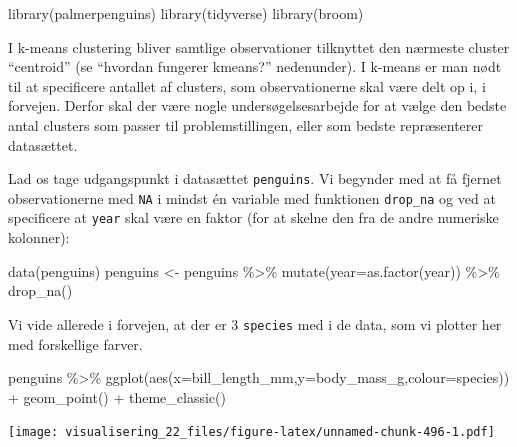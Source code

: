 \documentclass[
]{book}
\newenvironment{Shaded}{\begin{snugshade}}{\end{snugshade}}
\newcommand{\AttributeTok}[1]{\textcolor[rgb]{0.77,0.63,0.00}{#1}}
\newcommand{\FunctionTok}[1]{\textcolor[rgb]{0.00,0.00,0.00}{#1}}
\newcommand{\NormalTok}[1]{#1}
\newcommand{\OtherTok}[1]{\textcolor[rgb]{0.56,0.35,0.01}{#1}}
\newcommand{\SpecialCharTok}[1]{\textcolor[rgb]{0.00,0.00,0.00}{#1}}
\begin{document}
\begin{Shaded}
\begin{Highlighting}[]
\FunctionTok{library}\NormalTok{(palmerpenguins)}
\FunctionTok{library}\NormalTok{(tidyverse)}
\FunctionTok{library}\NormalTok{(broom)}
\end{Highlighting}
\end{Shaded}

I k-means clustering bliver samtlige observationer tilknyttet den nærmeste cluster ``centroid'' (se ``hvordan fungerer kmeans?'' nedenunder). I k-means er man nødt til at specificere antallet af clusters, som observationerne skal være delt op i, i forvejen. Derfor skal der være nogle undersøgelsesarbejde for at vælge den bedste antal clusters som passer til problemstillingen, eller som bedste repræsenterer datasættet.

Lad os tage udgangspunkt i datasættet \texttt{penguins}. Vi begynder med at få fjernet observationerne med \texttt{NA} i mindst én variable med funktionen \texttt{drop\_na} og ved at specificere at \texttt{year} skal være en faktor (for at skelne den fra de andre numeriske kolonner):

\begin{Shaded}
\begin{Highlighting}[]
\FunctionTok{data}\NormalTok{(penguins)}
\NormalTok{penguins }\OtherTok{\textless{}{-}}\NormalTok{ penguins }\SpecialCharTok{\%\textgreater{}\%} 
  \FunctionTok{mutate}\NormalTok{(}\AttributeTok{year=}\FunctionTok{as.factor}\NormalTok{(year)) }\SpecialCharTok{\%\textgreater{}\%}
  \FunctionTok{drop\_na}\NormalTok{() }
\end{Highlighting}
\end{Shaded}

Vi vide allerede i forvejen, at der er 3 \texttt{species} med i de data, som vi plotter her med forskellige farver.

\begin{Shaded}
\begin{Highlighting}[]
\NormalTok{penguins }\SpecialCharTok{\%\textgreater{}\%} \FunctionTok{ggplot}\NormalTok{(}\FunctionTok{aes}\NormalTok{(}\AttributeTok{x=}\NormalTok{bill\_length\_mm,}\AttributeTok{y=}\NormalTok{body\_mass\_g,}\AttributeTok{colour=}\NormalTok{species)) }\SpecialCharTok{+} 
  \FunctionTok{geom\_point}\NormalTok{() }\SpecialCharTok{+} 
  \FunctionTok{theme\_classic}\NormalTok{()}
\end{Highlighting}
\end{Shaded}

\texttt{[image: visualisering\_22\_files/figure-latex/unnamed-chunk-496-1.pdf]}
\end{document}
